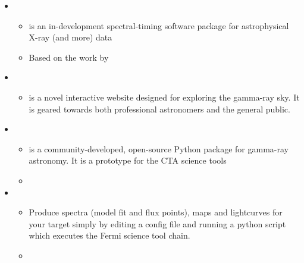 \documentclass[letterpaper,10pt,english]{sphinxmanual}
\begin{document}
\begin{itemize}
\item {} 
\begin{itemize}
\item {} 
 is an in-development spectral-timing software package
for astrophysical X-ray (and more) data

\item {} 
Based on the work by 

\end{itemize}

\item {} 
\begin{itemize}
\item {} 
 is a novel interactive website designed for
exploring the gamma-ray sky. It is geared towards both
professional astronomers and the general public.

\end{itemize}

\item {} 
\begin{itemize}
\item {} 
 is a community-developed, open-source Python package
for gamma-ray astronomy. It is a prototype for the CTA science
tools

\item {} 

\end{itemize}

\item {} 
\begin{itemize}
\item {} 
Produce spectra (model fit and flux points), maps and lightcurves
for your target simply by editing a config file and running a
python script which executes the Fermi science tool chain.

\item {} 


\end{itemize}
\end{itemize}
\end{document}
